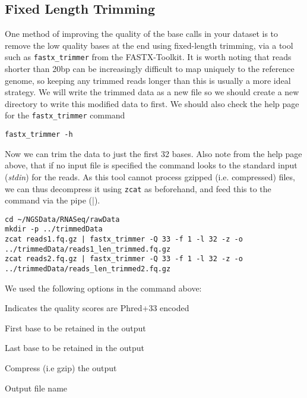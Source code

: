 \subsection{Fixed Length Trimming}
One method of improving the quality of the base calls in your dataset is to remove the low quality bases at the end using fixed-length trimming, via a tool such as \texttt{fastx_trimmer} from the FASTX-Toolkit.
It is worth noting that reads shorter than 20bp can be increasingly difficult to map uniquely to the reference genome, so keeping any trimmed reads longer than this is usually a more ideal strategy.
We will write the trimmed data as a new file so we should create a new directory to write this modified data to first.
We should also check the help page for the \texttt{fastx_trimmer} command
\begin{steps}
\begin{lstlisting}
fastx_trimmer -h
\end{lstlisting}
\end{steps}

\begin{steps}
Now we can trim the data to just the first 32 bases.
Also note from the help page above, that if no input file is specified the command looks to the standard input (\textit{stdin}) for the reads.
As this tool cannot process gzipped (i.e. compressed) files, we can thus decompress it using \texttt{zcat} as beforehand, and feed this to the command via the pipe (|).
\end{steps}

\begin{lstlisting}
cd ~/NGSData/RNASeq/rawData
mkdir -p ../trimmedData
zcat reads1.fq.gz | fastx_trimmer -Q 33 -f 1 -l 32 -z -o  ../trimmedData/reads1_len_trimmed.fq.gz
zcat reads2.fq.gz | fastx_trimmer -Q 33 -f 1 -l 32 -z -o ../trimmedData/reads_len_trimmed2.fq.gz
\end{lstlisting}

\begin{note}
We used the following options in the command above:
\begin{description}[style=multiline,labelindent=0cm,align=right,leftmargin=0.8\descriptionlabelspace,rightmargin=1.5cm,font=\ttfamily]
\item[-Q 33] Indicates the quality scores are Phred+33 encoded
\item[-f 1] First base to be retained in the output
\item[-l 32] Last base to be retained in the output
\item[-z] Compress (i.e gzip) the output
\item[-o] Output file name
\end{description}
\end{note}

